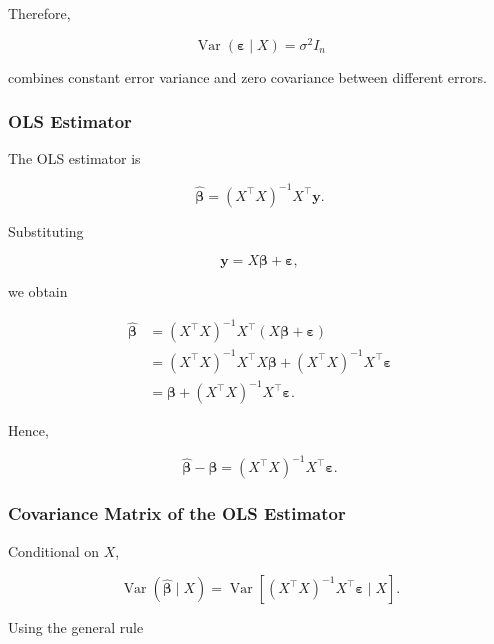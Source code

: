 Therefore,

\[
\boxed{
\operatorname{Var}
(\boldsymbol{\varepsilon}\mid X)
=
\sigma^2I_n
}
\]

combines constant error variance and zero covariance between different
errors.



\subsubsection*{OLS Estimator}

The OLS estimator is

\[
\boxed{
\widehat{\boldsymbol{\beta}}
=
(X^\top X)^{-1}X^\top\mathbf{y}.
}
\]

Substituting

\[
\mathbf{y}
=
X\boldsymbol{\beta}
+
\boldsymbol{\varepsilon},
\]

we obtain

\[
\begin{aligned}
\widehat{\boldsymbol{\beta}}
&=
(X^\top X)^{-1}
X^\top
\left(
X\boldsymbol{\beta}
+
\boldsymbol{\varepsilon}
\right)
\\
&=
(X^\top X)^{-1}X^\top X\boldsymbol{\beta}
+
(X^\top X)^{-1}X^\top\boldsymbol{\varepsilon}
\\
&=
\boldsymbol{\beta}
+
(X^\top X)^{-1}X^\top\boldsymbol{\varepsilon}.
\end{aligned}
\]

Hence,

\[
\boxed{
\widehat{\boldsymbol{\beta}}
-
\boldsymbol{\beta}
=
(X^\top X)^{-1}
X^\top
\boldsymbol{\varepsilon}.
}
\]



\subsubsection*{Covariance Matrix of the OLS Estimator}

Conditional on \(X\),

\[
\operatorname{Var}
\left(
\widehat{\boldsymbol{\beta}}\mid X
\right)
=
\operatorname{Var}
\left[
(X^\top X)^{-1}
X^\top
\boldsymbol{\varepsilon}
\mid X
\right].
\]

Using the general rule

